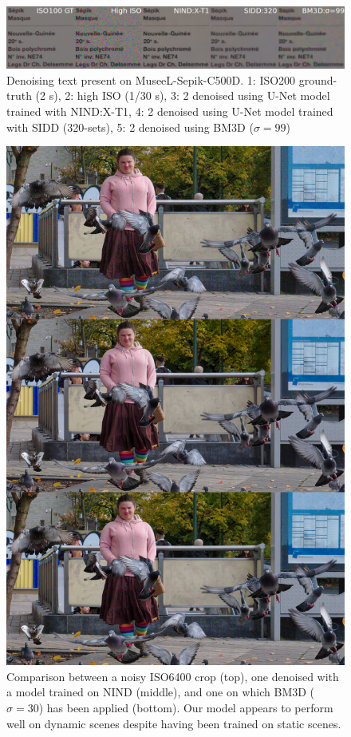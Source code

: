 \begin{figure}[!htbp]
\centering
\includegraphics[width=1\linewidth]{gfx/comp/txt.jpg}
\caption[Denoising text present on MuseeL-Sepik-C500D (visual comparison)]{Denoising text present on MuseeL-Sepik-C500D. 1: ISO200 ground-truth (2 s), 2: high ISO (1/30 s), 3: 2 denoised using U-Net model trained with \acs{NIND}:\acs{X-T1}, 4: 2 denoised using U-Net model trained with \ac{SIDD} (320-sets), 5: 2 denoised using \acs{BM3D} ($\sigma=99$)}
\label{fig:text}
\end{figure}

\begin{figure}[!htbp]
\centering
\includegraphics[width=1\linewidth]{gfx/comp/comp-noisy-nind-bm3d30.jpg}
\caption[Denoising of an unpaired "high-speed" image (visual comparison)]{Comparison between a noisy ISO6400 crop (top), one denoised with a model trained on \ac{NIND} (middle), and one on which \ac{BM3D} ($\sigma=30$) has been applied (bottom). Our model appears to perform well on dynamic scenes despite having been trained on static scenes.}
\label{fig:visualpigeons}
\end{figure}


